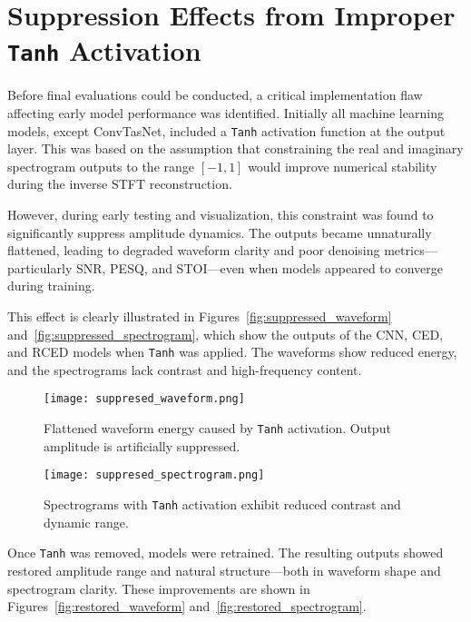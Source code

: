 \graphicspath{{content/appendices/figures}}
\chapter{Suppression Effects from Improper \texttt{Tanh} Activation}
\label{appendix:tanh_removal}

Before final evaluations could be conducted, a critical implementation flaw affecting early model performance was identified. Initially all machine learning models, except ConvTasNet, included a \texttt{Tanh} activation function at the output layer. This was based on the assumption that constraining the real and imaginary spectrogram outputs to the range \([-1, 1]\) would improve numerical stability during the inverse STFT reconstruction.

However, during early testing and visualization, this constraint was found to significantly suppress amplitude dynamics. The outputs became unnaturally flattened, leading to degraded waveform clarity and poor denoising metrics—particularly SNR, PESQ, and STOI—even when models appeared to converge during training.

This effect is clearly illustrated in Figures~\ref{fig:suppressed_waveform} and~\ref{fig:suppressed_spectrogram}, which show the outputs of the CNN, CED, and RCED models when \texttt{Tanh} was applied. The waveforms show reduced energy, and the spectrograms lack contrast and high-frequency content.


\begin{figure}[H]
    \centering
    \texttt{[image: suppresed\_waveform.png]}
    \caption{\label{fig:suppresed_waveform} Flattened waveform energy caused by \texttt{Tanh} activation. Output amplitude is artificially suppressed.}
\end{figure}

\begin{figure}[H]
    \centering
    \texttt{[image: suppresed\_spectrogram.png]}
    \caption{\label{fig:suppresed_spectrogram} Spectrograms with \texttt{Tanh} activation exhibit reduced contrast and dynamic range.}
\end{figure}

Once \texttt{Tanh} was removed, models were retrained. The resulting outputs showed restored amplitude range and natural structure—both in waveform shape and spectrogram clarity. These improvements are shown in Figures~\ref{fig:restored_waveform} and~\ref{fig:restored_spectrogram}.

